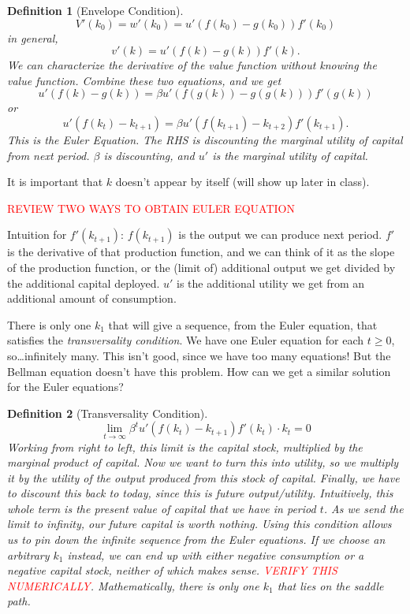 \documentclass[11pt]{article}
\newtheorem*{definition}{Definition}
\newcommand{\rd}{\textcolor{red}}
\begin{document}
\begin{definition}[Envelope Condition]
\[
V'(k_0) = w'(k_0) = u'(f(k_0) - g(k_0))f'(k_0) \tag{chain rule}
\]
in general,
\[
v'(k) = u'(f(k) - g(k))f'(k).
\]
We can characterize the derivative of the value function without knowing the value function. Combine these two equations, and we get
\[
u'(f(k) - g(k)) = \beta u'(f(g(k)) - g(g(k)))f'(g(k))
\]
or
\[
u'(f(k_t) - k_{t + 1}) = \beta u'(f(k_{t + 1}) - k_{t + 2})f'(k_{t + 1}). 
\]
This is the Euler Equation. The RHS is discounting the marginal utility of capital from next period. $\beta$ is discounting, and $u'$ is the marginal utility of capital.
\end{definition}
It is important that \(k\) doesn't appear by itself (will show up later in class).

\rd{REVIEW TWO WAYS TO OBTAIN EULER EQUATION}

Intuition for \(f'(k_{t + 1})\): \(f(k_{t + 1})\) is the output we can produce next period. \(f'\) is the derivative of that production function, and we can think of it as the slope of the production function, or the (limit of) additional output we get divided by the additional capital deployed. \(u'\) is the additional utility we get from an additional amount of consumption.

There is only one \(k_1\) that will give a sequence, from the Euler equation, that satisfies the \emph{transversality condition}. We have one Euler equation for each \(t \ge 0\), so\ldots infinitely many. This isn't good, since we have too many equations! But the Bellman equation doesn't have this problem. How can we get a similar solution for the Euler equations?

\begin{definition}[Transversality Condition]
\[
\lim_{t \to \infty} \beta^t u'(f(k_t) - k_{t + 1}) f'(k_t) \cdot k_t = 0
\]
Working from right to left, this limit is the capital stock, multiplied by the marginal product of capital. Now we want to turn this into utility, so we multiply it by the utility of the output produced from this stock of capital. Finally, we have to discount this back to today, since this is future output/utility. Intuitively, this whole term is the present value of capital that we have in period $t$. As we send the limit to infinity, our future capital is worth nothing. Using this condition allows us to pin down the infinite sequence from the Euler equations. If we choose an arbitrary $k_1$ instead, we can end up with either negative consumption or a negative capital stock, neither of which makes sense. \rd{VERIFY THIS NUMERICALLY}. Mathematically, there is only one $k_1$ that lies on the saddle path.
\end{definition}
\end{document}
